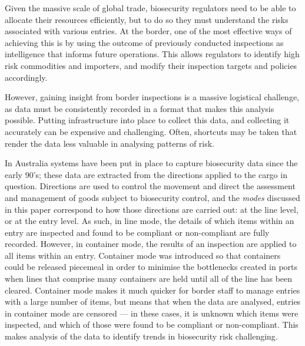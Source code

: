 \documentclass[aoas]{imsart}
\begin{document}
Given the massive scale of global trade, biosecurity regulators need to be able to allocate their resources efficiently, but to do so they must understand the risks associated with various entries. At the border, one of the most effective ways of achieving this is by using the outcome of previously conducted inspections as intelligence that informs future operations. This allows regulators to identify high risk commodities and importers, and modify their inspection targets and policies accordingly.

However, gaining insight from border inspections is a massive logistical challenge, as data must be consistently recorded in a format that makes this analysis possible. Putting infrastructure into place to collect this data, and collecting it accurately can be expensive and challenging. Often, shortcuts may be taken that render the data less valuable in analysing patterns of risk.

In Australia systems have been put in place to capture biosecurity data since the early 90's;  {these data are extracted from the directions applied to the cargo in question. Directions are used to control the movement and direct the assessment and management of goods subject to biosecurity control, and the \emph{modes} discussed in this paper correspond to how those directions are carried out: at the line level, or at the entry level.}  As such, in line mode, the details of which items within an entry are inspected and found to be compliant or non-compliant are fully recorded. However, in container mode, the results of an inspection are applied to all items within an entry. Container mode was introduced so that containers could be released piecemeal in order to minimise the bottlenecks created in ports when lines that comprise many containers are held until all of the line has been cleared. Container mode makes it much quicker for border staff to manage entries with a large number of items, but means that when the data are analysed, entries in container mode are censored --- in these cases, it is unknown which items were inspected, and which of those were found to be compliant or non-compliant. This makes analysis of the data to identify trends in biosecurity risk challenging. 
\end{document}
